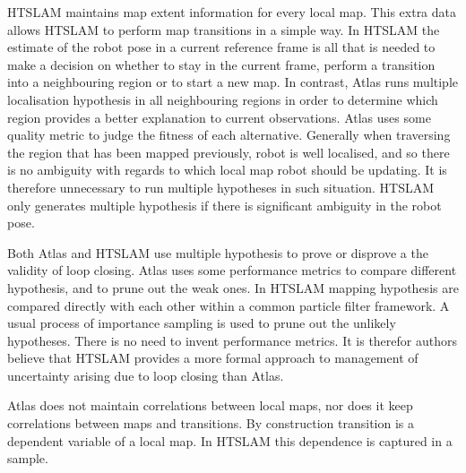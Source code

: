 
HTSLAM maintains map extent information for every local map. This
extra data allows HTSLAM to perform map transitions in a simple
way. In HTSLAM the estimate of the robot pose in a current reference
frame is all that is needed to make a decision on whether to stay in
the current frame, perform a transition into a neighbouring region or
to start a new map. In contrast, Atlas runs multiple localisation
hypothesis in all neighbouring regions in order to determine which
region provides a better explanation to current observations. Atlas
uses some quality metric to judge the fitness of each
alternative. Generally when traversing the region that has been mapped
previously, robot is well localised, and so there is no ambiguity with
regards to which local map robot should be updating. It is therefore
unnecessary to run multiple hypotheses in such situation. HTSLAM only
generates multiple hypothesis if there is significant ambiguity in the
robot pose.


Both Atlas and HTSLAM use multiple hypothesis to prove or disprove a
the validity of loop closing. Atlas uses some performance metrics to
compare different hypothesis, and to prune out the weak ones. In
HTSLAM mapping hypothesis are compared directly with each other within
a common particle filter framework. A usual process of importance
sampling is used to prune out the unlikely hypotheses. There is no
need to invent performance metrics. It is therefor authors believe
that HTSLAM provides a more formal approach to management of
uncertainty arising due to loop closing than Atlas.



Atlas does not maintain correlations between local maps, nor does it
keep correlations between maps and transitions. By construction
transition is a dependent variable of a local map. In HTSLAM this
dependence is captured in a sample.






